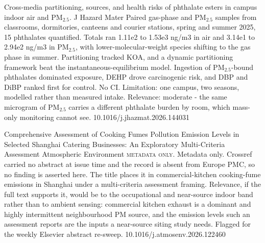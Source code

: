 \documentclass[10pt]{article}
\begin{document}
\par{}\baselineskip{}\baselineskip
{}

{Cross-media partitioning, sources, and health risks of phthalate esters in campus indoor air and PM$_{2.5}$.}
{J Hazard Mater}
{Paired gas-phase and PM$_{2.5}$ samples from classrooms, dormitories, canteens and courier stations, spring and summer 2025, 15 phthalates quantified. Totals ran 1.11e2 to 1.53e3 ng/m3 in air and 3.14e1 to 2.94e2 ng/m3 in PM$_{2.5}$, with lower-molecular-weight species shifting to the gas phase in summer. Partitioning tracked KOA, and a dynamic partitioning framework beat the instantaneous-equilibrium model. Ingestion of PM$_{2.5}$-bound phthalates dominated exposure, DEHP drove carcinogenic risk, and DBP and DiBP ranked first for control. No CI. Limitation: one campus, two seasons, modelled rather than measured intake. Relevance: moderate - the same microgram of PM$_{2.5}$ carries a different phthalate burden by room, which mass-only monitoring cannot see.}
{10.1016/j.jhazmat.2026.144031}

{Comprehensive Assessment of Cooking Fumes Pollution Emission Levels in Selected Shanghai Catering Businesses: An Exploratory Multi-Criteria Assessment}
{Atmospheric Environment}
{\textsc{metadata only.} Metadata only. Crossref carried no abstract at issue time and the record is absent from Europe PMC, so no finding is asserted here. The title places it in commercial-kitchen cooking-fume emissions in Shanghai under a multi-criteria assessment framing. Relevance, if the full text supports it, would be to the occupational and near-source indoor band rather than to ambient sensing: commercial kitchen exhaust is a dominant and highly intermittent neighbourhood PM source, and the emission levels such an assessment reports are the inputs a near-source siting study needs. Flagged for the weekly Elsevier abstract re-sweep.}
{10.1016/j.atmosenv.2026.122460}
\end{document}
